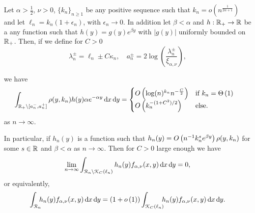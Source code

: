 \begin{lemma}\label{lem:concentration_argument}
Let $\alpha > \frac{1}{2}$, $\nu > 0$, $\{k_n\}_{n \ge 1}$ be any positive sequence such that $k_n = o(n^{\frac{1}{2\alpha + 1}})$ and let $\ell_n = k_n(1 + \epsilon_n)$, with $\epsilon_n \to 0$. In addition let $\beta < \alpha$ and $h : {\mathbb R}_+ \rightarrow  {\ensuremath{\mathbb R}}$ be a any function such that $h(y) = g(y)e^{\beta y}$ with $|g(y)|$ uniformly bounded on ${\mathbb R}_+$. Then, if we define for $C > 0$
\[
	\lambda_n^\pm = \ell_n \pm C \kappa_n, 
	\quad a_n^\pm = 2 \log\left(\frac{\lambda_n^\pm}{\xi_{\alpha,\nu}}\right),
\] 

we have
\begin{equation}\label{eq:error_bound_int_rho_not_K}
\begin{aligned}
	\int_{{\mathbb R}_+ \setminus [a_n^-, a_n^+]} \rho(y,k_n) h(y) \alpha e^{-\alpha y} \operatorname{\mathrm{d}\hspace{-2pt}} x \operatorname{\mathrm{d}\hspace{-2pt}} y
	&= \begin{cases}
		O\left(\log(n)^{k_n} n^{-\frac{C}{2}}\right) &\mbox{if } k_n = \Theta\left(1\right) \\
		O\left(k_n^{-(1+C^2)/2}\right) &\mbox{else.}
	\end{cases}
\end{aligned}
\end{equation}
as $n \to \infty$. 

In particular, if $h_n(y)$ is a function such that $h_n(y) = O\left(n^{-1} k_n^{s} e^{\beta y}\right)\rho(y,k_n)$ for some $s \in {\ensuremath{\mathbb R}}$ and $\beta < \alpha$ as $n \to \infty$. Then for $C > 0$ large enough we have
\[
	\lim_{n \to \infty} \int_{{\mathcal R}_n \setminus {\mathcal K}_{C}(\ell_n)} h_n(y) f_{\alpha,\nu}(x,y) \operatorname{\mathrm{d}\hspace{-2pt}} x\operatorname{\mathrm{d}\hspace{-2pt}} y = 0,
\]
or equivalently,
\[
	\int_{{\mathcal R}_n} \hspace{-5pt} h_n(y) f_{\alpha,\nu}(x,y) \operatorname{\mathrm{d}\hspace{-2pt}} x \operatorname{\mathrm{d}\hspace{-2pt}} y
	= (1+o\left(1\right)) \int_{{\mathcal K}_{C}(\ell_n)} \hspace{-5pt} h_n(y) f_{\alpha,\nu}(x,y) \operatorname{\mathrm{d}\hspace{-2pt}} x \operatorname{\mathrm{d}\hspace{-2pt}} y.
\]
\end{lemma}

